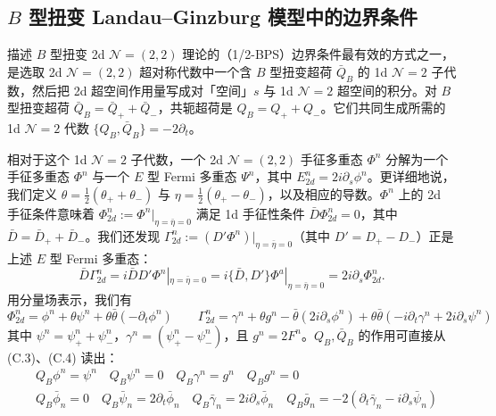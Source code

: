 \subsection{$B$ 型扭变 Landau–Ginzburg 模型中的边界条件}
描述 $B$ 型扭变 2d $\mathcal{N}=(2,2)$ 理论的（1/2-BPS）边界条件最有效的方式之一，是选取 2d $\mathcal{N}=(2,2)$ 超对称代数中一个含 $B$ 型扭变超荷 $\bar Q_B$ 的 1d $\mathcal{N}=2$ 子代数，然后把 2d 超空间作用量写成对「空间」$s$ 与 1d $\mathcal{N}=2$ 超空间的积分。对 $B$ 型扭变超荷 $\bar Q_B=\bar Q_++\bar Q_-$，共轭超荷是 $Q_B=Q_++Q_-$。它们共同生成所需的 1d $\mathcal{N}=2$ 代数 $\{Q_B,\bar Q_B\}=-2\partial_t$。

相对于这个 1d $\mathcal{N}=2$ 子代数，一个 2d $\mathcal{N}=(2,2)$ 手征多重态 $\Phi^n$ 分解为一个手征多重态 $\Phi^n$ 与一个 $E$ 型 Fermi 多重态 $\Psi^n$，其中 $E^n_{2d}=2i\partial_s\phi^n$。更详细地说，我们定义 $\theta=\frac{1}{2}(\theta_++\theta_-)$ 与 $\eta=\frac{1}{2}(\theta_+-\theta_-)$，以及相应的导数。$\Phi^n$ 上的 2d 手征条件意味着 $\Phi^n_{2d}:=\Phi^n|_{\eta=\bar\eta=0}$ 满足 1d 手征性条件 $\bar D\Phi^n_{2d}=0$，其中 $\bar D=\bar D_++\bar D_-$。我们还发现 $\Gamma^n_{2d}:=(D'\Phi^n)|_{\eta=\bar\eta=0}$（其中 $D'=D_+-D_-$）正是上述 $E$ 型 Fermi 多重态：
\begin{equation}\tag{C.8}
  \bar D\Gamma^n_{2d}=i\bar DD'\Phi^n|_{\eta=\bar\eta=0}=i\{\bar D,D'\}\Phi^a|_{\eta=\bar\eta=0}=2i\partial_s\Phi^n_{2d}.
\end{equation}
用分量场表示，我们有
\begin{equation}\tag{C.9}
  \Phi^n_{2d}=\phi^n+\theta\psi^n+\theta\bar\theta(-\partial_t\phi^n)\qquad \Gamma^n_{2d}=\gamma^n+\theta g^n-\bar\theta(2i\partial_s\phi^n)+\theta\bar\theta(-i\partial_t\gamma^n+2i\partial_s\psi^n)
\end{equation}
其中 $\psi^n=\psi^n_++\psi^n_-$，$\gamma^n=(\psi^n_+-\psi^n_-)$，且 $g^n=2F^n$。$Q_B,\bar Q_B$ 的作用可直接从 (C.3)、(C.4) 读出：
\begin{equation}\tag{C.10}
  \begin{aligned}
  &Q_B\phi^n=\psi^n\quad Q_B\psi^n=0\quad Q_B\gamma^n=g^n\quad Q_Bg^n=0\\
  &Q_B\bar\phi_n=0\quad Q_B\bar\psi_n=2\partial_t\bar\phi_n\quad Q_B\bar\gamma_n=2i\partial_s\bar\phi_n\quad Q_B\bar g_n=-2(\partial_t\bar\gamma_n-i\partial_s\bar\psi_n)
  \end{aligned}
\end{equation}
